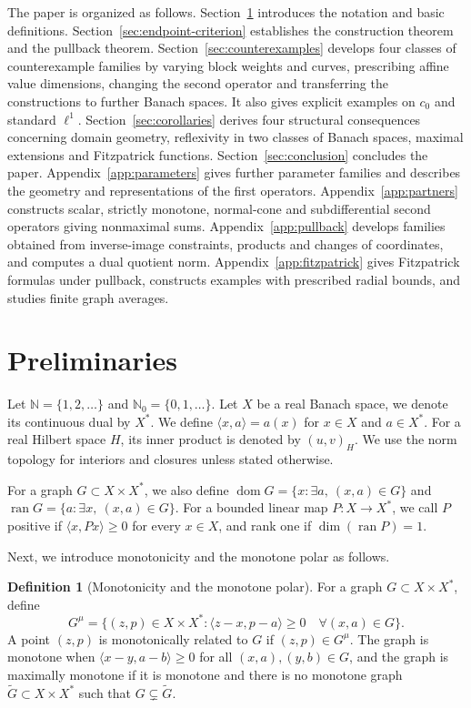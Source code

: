\documentclass[11pt]{article}
\newcommand{\N}{\mathbb N}
\newcommand{\dom}{\operatorname{dom}}
\newcommand{\pair}[2]{\langle #1,#2\rangle}
\theoremstyle{definition}
\newtheorem{definition}{Definition}
\theoremstyle{remark}
\begin{document}
The paper is organized as follows. Section~\ref{sec:definitions} introduces the notation and basic definitions. Section~\ref{sec:endpoint-criterion} establishes the construction theorem and the pullback theorem. Section~\ref{sec:counterexamples} develops four classes of counterexample families by varying block weights and curves, prescribing affine value dimensions, changing the second operator and transferring the constructions to further Banach spaces. It also gives explicit examples on $c_0$ and standard $\ell^1$. Section~\ref{sec:corollaries} derives four structural consequences concerning domain geometry, reflexivity in two classes of Banach spaces, maximal extensions and Fitzpatrick functions. Section~\ref{sec:conclusion} concludes the paper. Appendix~\ref{app:parameters} gives further parameter families and describes the geometry and representations of the first operators. Appendix~\ref{app:partners} constructs scalar, strictly monotone, normal-cone and subdifferential second operators giving nonmaximal sums. Appendix~\ref{app:pullback} develops families obtained from inverse-image constraints, products and changes of coordinates, and computes a dual quotient norm. Appendix~\ref{app:fitzpatrick} gives Fitzpatrick formulas under pullback, constructs examples with prescribed radial bounds, and studies finite graph averages. 


\section{Preliminaries}
\label{sec:definitions}
Let $\N=\{1,2,\ldots\}$ and $\N_0=\{0,1,\ldots\}$. Let $X$ be a real Banach space, we denote its continuous dual by $X^*$. We define $\pair{x}{a}=a(x)$ for $x\in X$ and $a\in X^*$. For a real Hilbert space $H$, its inner product is denoted by $(u,v)_H$. We use the norm topology for interiors and closures unless stated otherwise. 

For a graph $G\subset X\times X^*$, we also define $\dom G=\{x:\exists a,\ (x,a)\in G\}$ and $\operatorname{ran}G=\{a:\exists x,\ (x,a)\in G\}$. 
For a bounded linear map $P:X\to X^*$, we call $P$ positive if $\pair{x}{Px}\ge0$ for every $x\in X$, and rank one if $\dim(\operatorname{ran}P)=1$. 

Next, we introduce monotonicity and the monotone polar  \cite{martinezsvaiter2005,bauschkemclarensendov2006} as follows. 

\begin{definition}[Monotonicity and the monotone polar]
\label{D1}
For a graph $G\subset X\times X^*$, define
\begin{equation}
G^\mu=\{(z,p)\in X\times X^*:
 \pair{z-x}{p-a}\ge0\quad\forall(x,a)\in G\}.
\label{eq:D1}
\end{equation}
A point $(z,p)$ is monotonically related to $G$ if $(z,p)\in G^\mu$.
The graph is monotone when $\pair{x-y}{a-b}\ge0$ for all $(x,a),(y,b)\in G$, and the graph is maximally monotone if it is monotone and there is no monotone graph $\widetilde G\subset X\times X^*$ such that $G\subsetneq\widetilde G$. 
\end{definition}
\end{document}

